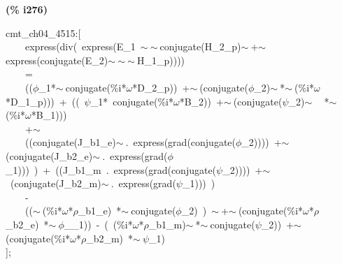 \documentclass[fleqn]{article}
\begin{document}
\noindent
\begin{minipage}[t]{4.000000em}\color{red}\bfseries
(\% i276)	
\end{minipage}
\begin{minipage}[t]{\textwidth}\color{blue}
cmt\_ch04\_4515:[\\
\ \ \ \ express(div(\ express(E\_1\ \ensuremath{\sim\ }\ensuremath{\sim\ }conjugate(H\_2\_p)\ensuremath{\sim\ }+\ensuremath{\sim\ }express(conjugate(E\_2)\ensuremath{\sim\ }\ensuremath{\sim\ }\ensuremath{\sim\ }H\_1\_p))))\ \\
\ \ \ \ =\ \\
\ \ \ \ ((\ensuremath{\phi}\_1*\ensuremath{\sim\ }conjugate(\%i*\ensuremath{\omega}*D\_2\_p))\ +\ensuremath{\sim\ }(conjugate(\ensuremath{\phi}\_2)\ensuremath{\sim\ }*\ensuremath{\sim\ }(\%i*\ensuremath{\omega}*D\_1\_p)))\ +\ ((\ \ensuremath{\psi}\_1*\ conjugate(\%i*\ensuremath{\omega}*B\_2))\ +\ensuremath{\sim\ }(conjugate(\ensuremath{\psi}\_2)\ensuremath{\sim\ }\ \ *\ensuremath{\sim\ }(\%i*\ensuremath{\omega}*B\_1)))\\
\ \ \ \ +\ensuremath{\sim\ }\ \ \ \ \ \ \ \\
\ \ \ \ ((conjugate(J\_b1\_e)\ensuremath{\sim\ }.\ express(grad(conjugate(\ensuremath{\phi}\_2))))\ +\ensuremath{\sim\ }(conjugate(J\_b2\_e)\ensuremath{\sim\ }.\ express(grad(\ensuremath{\phi}\_1)))\ )\ +\ ((J\_b1\_m\ .\ express(grad(conjugate(\ensuremath{\psi}\_2))))\ +\ensuremath{\sim\ }\ (conjugate(J\_b2\_m)\ensuremath{\sim\ }.\ express(grad(\ensuremath{\psi}\_1)))\ )\\
\ \ \ \ -\\
\ \ \ \ ((\ensuremath{\sim\ }(\%i*\ensuremath{\omega}*\ensuremath{\rho}\_b1\_e)\ *\ensuremath{\sim\ }conjugate(\ensuremath{\phi}\_2)\ )\ \ensuremath{\sim\ }+\ensuremath{\sim\ }(conjugate(\%i*\ensuremath{\omega}*\ensuremath{\rho}\_b2\_e)\ *\ensuremath{\sim\ }\ensuremath{\phi}\_\_1))\ -\ (\ (\%i*\ensuremath{\omega}*\ensuremath{\rho}\_b1\_m)\ensuremath{\sim\ }*\ensuremath{\sim\ }conjugate(\ensuremath{\psi}\_2))\ +\ensuremath{\sim\ }(conjugate(\%i*\ensuremath{\omega}*\ensuremath{\rho}\_b2\_m)\ *\ensuremath{\sim\ }\ensuremath{\psi}\_1)\\
];
\end{minipage}
\end{document}
